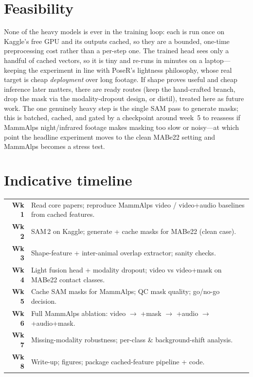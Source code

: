 \documentclass[11pt]{article}
\begin{document}
\section{Feasibility}
None of the heavy models is ever in the training loop: each is run once on Kaggle's free GPU and its outputs cached, so they are a bounded, one-time preprocessing cost rather than a per-step one. The trained head sees only a handful of cached vectors, so it is tiny and re-runs in minutes on a laptop---keeping the experiment in line with PoseR's lightness philosophy, whose real target is cheap \emph{deployment} over long footage. If shape proves useful and cheap inference later matters, there are ready routes (keep the hand-crafted branch, drop the mask via the modality-dropout design, or distil), treated here as future work. The one genuinely heavy step is the single SAM pass to generate masks; this is batched, cached, and gated by a checkpoint around week~5 to reassess if MammAlps night/infrared footage makes masking too slow or noisy---at which point the headline experiment moves to the clean MABe22 setting and MammAlps becomes a stress test.

\section*{Indicative timeline}
\noindent
\begin{tabular}{@{}rl@{}}
\textbf{Wk 1} & Read core papers; reproduce MammAlps video / video+audio baselines from cached features.\\
\textbf{Wk 2} & SAM\,2 on Kaggle; generate + cache masks for MABe22 (clean case).\\
\textbf{Wk 3} & Shape-feature + inter-animal overlap extractor; sanity checks.\\
\textbf{Wk 4} & Light fusion head + modality dropout; video vs video+mask on MABe22 contact classes.\\
\textbf{Wk 5} & Cache SAM masks for MammAlps; QC mask quality; go/no-go decision.\\
\textbf{Wk 6} & Full MammAlps ablation: video $\to$ +mask $\to$ +audio $\to$ +audio+mask.\\
\textbf{Wk 7} & Missing-modality robustness; per-class \& background-shift analysis.\\
\textbf{Wk 8} & Write-up; figures; package cached-feature pipeline + code.\\
\end{tabular}
\end{document}
